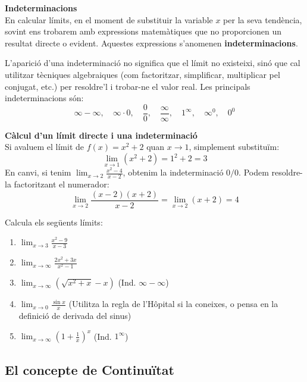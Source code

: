 \documentclass[12pt]{article}
\begin{document}
\begin{concept}
\textbf{Indeterminacions}\\
En calcular límits, en el moment de substituir la variable $x$ per la seva tendència, sovint ens trobarem amb expressions matemàtiques que no proporcionen un resultat directe o evident. Aquestes expressions s'anomenen \textbf{indeterminacions}. 

L'aparició d'una indeterminació no significa que el límit no existeixi, sinó que cal utilitzar tècniques algebraiques (com factoritzar, simplificar, multiplicar pel conjugat, etc.) per resoldre'l i trobar-ne el valor real. Les principals indeterminacions són:
\[ \infty-\infty, \quad \infty\cdot 0, \quad \frac{0}{0}, \quad \frac{\infty}{\infty}, \quad 1^\infty, \quad \infty^0, \quad 0^0 \]
\end{concept}

\begin{exemple}
\textbf{Càlcul d'un límit directe i una indeterminació}\\
Si avaluem el límit de $f(x) = x^2 + 2$ quan $x \to 1$, simplement substituïm:
\[ \lim_{x\to 1} (x^2 + 2) = 1^2 + 2 = 3 \]
En canvi, si tenim $\lim_{x\to 2} \frac{x^2 - 4}{x - 2}$, obtenim la indeterminació $0/0$. Podem resoldre-la factoritzant el numerador:
\[ \lim_{x\to 2} \frac{(x-2)(x+2)}{x-2} = \lim_{x\to 2} (x+2) = 4 \]
\end{exemple}

\begin{exercici}
Calcula els següents límits:
\begin{enumerate}
    \item $\lim_{x\to 3} \frac{x^2 - 9}{x - 3}$
    \item $\lim_{x\to \infty} \frac{2x^2 + 3x}{x^2 - 1}$
    \item $\lim_{x\to \infty} \left(\sqrt{x^2+x} - x\right)$ \quad (Ind. $\infty-\infty$)
    \item $\lim_{x\to 0} \frac{\sin x}{x}$ \quad (Utilitza la regla de l'Hôpital si la coneixes, o pensa en la definició de derivada del sinus)
    \item $\lim_{x\to \infty} \left(1+\frac{1}{x}\right)^x$ \quad (Ind. $1^\infty$)
\end{enumerate}
\end{exercici}


\subsection{El concepte de Continuïtat}
\end{document}
